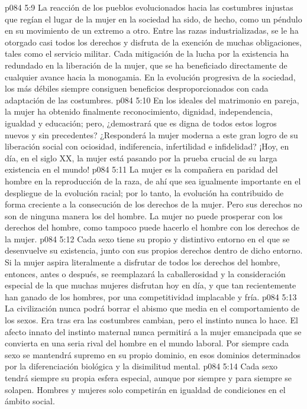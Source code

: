 \vs p084 5:9 \pc La reacción de los pueblos evolucionados hacia las costumbres injustas que regían el lugar de la mujer en la sociedad ha sido, de hecho, como un péndulo en su movimiento de un extremo a otro. Entre las razas industrializadas, se le ha otorgado casi todos los derechos y disfruta de la exención de muchas obligaciones, tales como el servicio militar. Cada mitigación de la lucha por la existencia ha redundado en la liberación de la mujer, que se ha beneficiado directamente de cualquier avance hacia la monogamia. En la evolución progresiva de la sociedad, los más débiles siempre consiguen beneficios desproporcionados con cada adaptación de las costumbres.
\vs p084 5:10 En los ideales del matrimonio en pareja, la mujer ha obtenido finalmente reconocimiento, dignidad, independencia, igualdad y educación; pero, ¿demostrará que es digna de todos estos logros nuevos y sin precedentes? ¿Responderá la mujer moderna a este gran logro de su liberación social con ociosidad, indiferencia, infertilidad e infidelidad? ¡Hoy, en día, en el siglo XX, la mujer está pasando por la prueba crucial de su larga existencia en el mundo!
\vs p084 5:11 La mujer es la compañera en paridad del hombre en la reproducción de la raza, de ahí que sea igualmente importante en el despliegue de la evolución racial; por lo tanto, la evolución ha contribuido de forma creciente a la consecución de los derechos de la mujer. Pero sus derechos no son de ninguna manera los del hombre. La mujer no puede prosperar con los derechos del hombre, como tampoco puede hacerlo el hombre con los derechos de la mujer.
\vs p084 5:12 Cada sexo tiene su propio y distintivo entorno en el que se desenvuelve su existencia, junto con sus propios derechos dentro de dicho entorno. Si la mujer aspira literalmente a disfrutar de todos los derechos del hombre, entonces, antes o después, se reemplazará la caballerosidad y la consideración especial de la que muchas mujeres disfrutan hoy en día, y que tan recientemente han ganado de los hombres, por una competitividad implacable y fría.
\vs p084 5:13 La civilización nunca podrá borrar el abismo que media en el comportamiento de los sexos. Era tras era las costumbres cambian, pero el instinto nunca lo hace. El afecto innato del instinto maternal nunca permitirá a la mujer emancipada que se convierta en una seria rival del hombre en el mundo laboral. Por siempre cada sexo se mantendrá supremo en su propio dominio, en esos dominios determinados por la diferenciación biológica y la disimilitud mental.
\vs p084 5:14 Cada sexo tendrá siempre su propia esfera especial, aunque por siempre y para siempre se solapen. Hombres y mujeres solo competirán en igualdad de condiciones en el ámbito social.
